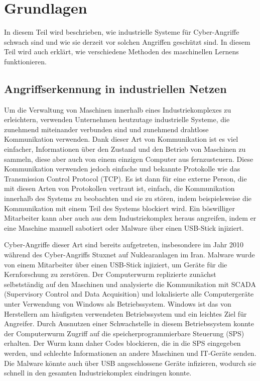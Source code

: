 \documentclass[12pt,a4paper]{scrartcl}
\numberwithin{equation}{section}
\begin{document}
 \newpage  %
  \pagestyle{headings}

\section{Grundlagen}

In diesem Teil wird beschrieben, wie industrielle Systeme für Cyber-Angriffe schwach sind und wie sie derzeit vor solchen Angriffen geschützt sind. In diesem Teil wird auch erklärt, wie verschiedene Methoden des maschinellen Lernens funktionieren. 

\subsection{Angriffserkennung in industriellen Netzen}

Um die Verwaltung von Maschinen innerhalb eines Industriekomplexes zu erleichtern, verwenden Unternehmen heutzutage industrielle Systeme, die zunehmend miteinander verbunden sind und zunehmend drahtlose Kommunikation verwenden. Dank dieser Art von Kommunikation ist es viel einfacher, Informationen über den Zustand und den Betrieb von Maschinen zu sammeln, diese aber auch von einem einzigen Computer aus fernzusteuern. Diese Kommunikation verwenden jedoch einfache und bekannte Protokolle wie das Transmission Control Protocol (TCP). Es ist dann für eine externe Person, die mit diesen Arten von Protokollen vertraut ist, einfach, die Kommunikation innerhalb des Systems zu beobachten und sie zu stören, indem beispielsweise die Kommunikation mit einem Teil des Systems blockiert wird. Ein böswilliger Mitarbeiter kann aber auch aus dem Industriekomplex heraus angreifen, indem er eine Maschine manuell sabotiert oder Malware über einen USB-Stick injiziert.

Cyber-Angriffe dieser Art sind bereits aufgetreten, insbesondere im Jahr 2010 während des Cyber-Angriffs Stuxnet auf Nuklearanlagen im Iran. Malware wurde von einem Mitarbeiter über einen USB-Stick injiziert, um Geräte für die Kernforschung zu zerstören. Der Computerwurm replizierte zunächst selbstständig auf den Maschinen\footnotemark{} und analysierte die Kommunikation mit SCADA (Supervisory Control and Data Acquisition) und lokalisierte alle Computergeräte unter Verwendung von Windows als Betriebssystem. Windows ist das von Herstellern am häufigsten verwendeten Betriebssystem und ein leichtes Ziel für Angreifer. Durch Ausnutzen einer Schwachstelle in diesem Betriebssystem konnte der Computerwurm Zugriff auf die speicherprogrammierbare Steuerung (SPS) erhalten. Der Wurm kann daher Codes blockieren, die in die SPS eingegeben werden, und schlechte Informationen an andere Maschinen und IT-Geräte senden. Die Malware könnte auch über USB angeschlossene Geräte infizieren, wodurch sie schnell in den gesamten Industriekomplex eindringen konnte.
\end{document}
